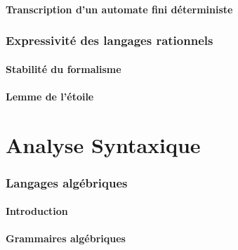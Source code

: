 \subsection{Transcription d'un automate fini déterministe}



 
\section{Expressivité des langages rationnels}
 
\subsection{Stabilité du formalisme}



 
\subsection{Lemme de l'étoile}



 
 
\part{Analyse Syntaxique}
 
 
\section{Langages algébriques}
 
\subsection{Introduction}



 
\subsection{Grammaires algébriques}





 
